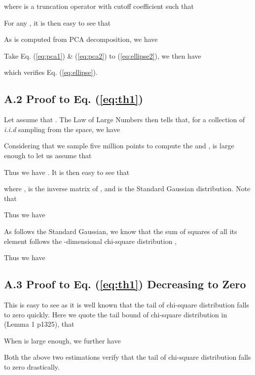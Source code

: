 \documentclass[10pt,twocolumn,letterpaper]{article}
\begin{document}
where  is a truncation operator with cutoff coefficient  such that


For any , it is then easy to see that

As  is computed from PCA decomposition, we have


Take Eq. (\ref{eq:pca1}) \& (\ref{eq:pca2}) to (\ref{eq:ellipse2}), we then have

which verifies Eq. (\ref{eq:ellipse}).


\subsection*{A.2 Proof to Eq. (\ref{eq:th1})}
Let assume that . The Law of Large Numbers \cite{chung2001course} then tells that, for a collection of \textit{i.i.d} sampling  from the  space, we have


Considering that we sample five million points to compute the  and ,  is large enough to let us assume that 

Thus we have . It is then easy to see that

where ,  is the inverse matrix of , and  is the Standard Gaussian distribution.
Note that

Thus we have

As  follows the Standard Gaussian, we know that the sum of squares of all its element follows the -dimensional chi-square distribution \cite{chung2001course,lancaster2005chi},

Thus we have 



\subsection*{A.3 Proof to Eq. (\ref{eq:th1}) Decreasing to Zero}
This is easy to see as it is well known that the tail of chi-square distribution falls to zero quickly. Here we quote the tail bound of chi-square distribution in \cite{laurent2000adaptive} (Lemma 1 p1325), that 

When  is large enough, we further have

Both the above two estimations verify that the tail of chi-square distribution falls to zero drastically.
\end{document}
